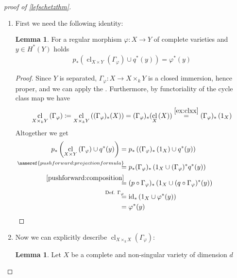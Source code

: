 \documentclass[english]{scrartcl}
\theoremstyle{definition}
\newtheorem{Lem}[Def]{Lemma}
\theoremstyle{remark}
\newcommand*{\id}{\text{id}} %
\newcommand*{\Graph}[1]{{\Gamma_{#1}}} %
\DeclareMathOperator{\CL}{cl} %
\newcommand*{\cl}[2]{{\CL_{#1}\left(#2\right)}} %
\newcommand*{\one}[1]{{1_{#1}}}%
\renewcommand*{\phi}{\varphi}
\begin{document}
\begin{proof}[proof of \autoref{lefschetzthm}]~
  \begin{enumerate}[label={Step \arabic*.}]
  \item %
    First we need the following identity:
    \begin{Lem}\label{step1}
      For a regular morphism $\phi\colon X\to Y$ of complete varieties
      and $y\in H^*(Y)$ holds
      \begin{gather*}
        p_*\left(\cl{X\times Y}{\Graph{\phi}} \cup q^*(y)\right)
        = \phi^*(y)           
      \end{gather*}
      \begin{proof}
        Since $Y$ is separated, $\Graph{\phi}\colon X\to X\times_k Y$
        is a closed immersion, hence proper, and we can apply the 
        . %
        Furthermore, by functoriality of the cycle class map we have
        \begin{gather}
          \cl{X\times_k Y}{\Graph{\phi}} \coloneqq
          \cl{X\times_k Y}{(\Graph{\phi})_*(X)} =
          (\Graph{\phi})_*(\cl{X}{X}) \overset{\ref{ex:clxx}}{=} %
          (\Graph{\phi})_*\left(\one{X}\right)
        \end{gather}
        Altogether we get
        \begin{align*}
          p_*\left(\cl{X\times Y}{\Graph{\phi}} \cup q^*(y)\right)
          &=  p_*\left(
            (\Graph{\phi})_*\left(\one{X}\right) \cup q^*(y)
            \right)\\
          &\overset{\mathllap{\nameref{pushforward:projectionformula}}}{=}
            p_*(\Graph{\phi})_*\left( \one{X} \cup (\Graph{\phi})^*q^*(y) \right)\\
          &\overset{\mathllap{\eqref{pushforward:composition}}}=
            (p\circ\Graph{\phi})_* \left(
            \one{X} \cup (q\circ\Graph{\phi})^*(y) \right)\\
          &\overset{\mathllap{\text{Def. $\Graph\phi$}}}=
            \id_* \left( \one{X} \cup \phi^*(y) \right)\\
          &= \phi^*(y)
        \end{align*}
      \end{proof}
    \end{Lem}
  \item Now we can explicitly describe
    $\cl{X\times_k X}{\Graph{\phi}}$:
    \begin{Lem}
      Let $X$ be a complete and non-singular variety of dimension $d$

\end{Lem}
\end{enumerate}
\end{proof}
\end{document}
